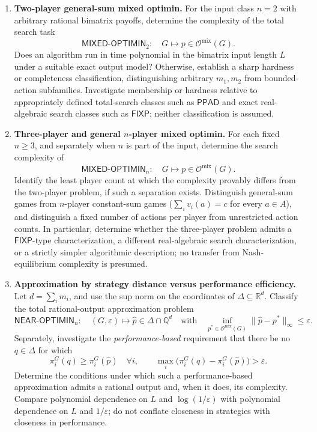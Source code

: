 \documentclass[11pt,a4paper]{article}
\begin{document}
\begin{enumerate}[label=\textbf{(\Alph*)},leftmargin=2.7em]

\item \textbf{Two-player general-sum mixed optimin.}
For the input class $n=2$ with arbitrary rational bimatrix payoffs, determine the complexity of the total search task
\[
\mathsf{MIXED\text{-}OPTIMIN}_2:\quad
G\longmapsto p\in\mathcal O^{\mathrm{mix}}(G).
\]
Does an algorithm run in time polynomial in the bimatrix input length $L$ under a suitable exact output model? Otherwise, establish a sharp hardness or completeness classification, distinguishing arbitrary $m_1,m_2$ from bounded-action subfamilies. Investigate membership or hardness relative to appropriately defined total-search classes such as $\mathsf{PPAD}$ and exact real-algebraic search classes such as $\mathsf{FIXP}$; neither classification is assumed.

\item \textbf{Three-player and general $n$-player mixed optimin.}
For each fixed $n\ge3$, and separately when $n$ is part of the input, determine the search complexity of
\[
\mathsf{MIXED\text{-}OPTIMIN}_n:\quad
G\longmapsto p\in\mathcal O^{\mathrm{mix}}(G).
\]
Identify the least player count at which the complexity provably differs from the two-player problem, if such a separation exists. Distinguish general-sum games from $n$-player constant-sum games ($\sum_i v_i(a)=c$ for every $a\in A$), and distinguish a fixed number of actions per player from unrestricted action counts. In particular, determine whether the three-player problem admits a $\mathsf{FIXP}$-type characterization, a different real-algebraic search characterization, or a strictly simpler algorithmic description; no transfer from Nash-equilibrium complexity is presumed.

\item \textbf{Approximation by strategy distance versus performance efficiency.}
Let $d=\sum_i m_i$, and use the sup norm on the coordinates of $\Delta\subseteq\mathbb R^d$. Classify the total rational-output approximation problem
\[
\mathsf{NEAR\text{-}OPTIMIN}_n:\quad
(G,\varepsilon)\longmapsto\widehat p\in\Delta\cap\mathbb Q^d
\quad\text{with}\quad
\inf_{p^*\in\mathcal O^{\mathrm{mix}}(G)}
\|\widehat p-p^*\|_\infty\le\varepsilon.
\]
Separately, investigate the \emph{performance-based} requirement that there be no $q\in\Delta$ for which
\[
\pi_i^G(q)\ge\pi_i^G(\widehat p)\quad\forall i,
\qquad \max_i\bigl(\pi_i^G(q)-\pi_i^G(\widehat p)\bigr)>\varepsilon.
\]
Determine the conditions under which such a performance-based approximation admits a rational output and, when it does, its complexity. Compare polynomial dependence on $L$ and $\log(1/\varepsilon)$ with polynomial dependence on $L$ and $1/\varepsilon$; do not conflate closeness in strategies with closeness in performance.


\end{enumerate}
\end{document}

